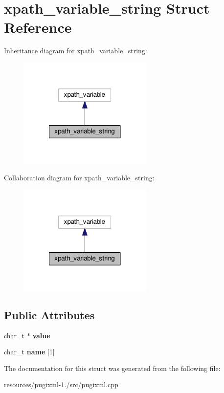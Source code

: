 \hypertarget{structxpath__variable__string}{\section{xpath\+\_\+variable\+\_\+string Struct Reference}
\label{structxpath__variable__string}
}


Inheritance diagram for xpath\+\_\+variable\+\_\+string\+:
\nopagebreak
\begin{figure}[H]
\begin{center}
\leavevmode
\includegraphics[width=188pt]{structxpath__variable__string__inherit__graph}
\end{center}
\end{figure}


Collaboration diagram for xpath\+\_\+variable\+\_\+string\+:
\nopagebreak
\begin{figure}[H]
\begin{center}
\leavevmode
\includegraphics[width=188pt]{structxpath__variable__string__coll__graph}
\end{center}
\end{figure}
\subsection*{Public Attributes}
\begin{DoxyCompactItemize}
\item 
\hypertarget{structxpath__variable__string_aeb8a87a8457d2615cd7b766fd3f30559}{char\+\_\+t $\ast$ {\bfseries value}}\label{structxpath__variable__string_aeb8a87a8457d2615cd7b766fd3f30559}

\item 
\hypertarget{structxpath__variable__string_a5c43cdcc55a620db0e7bdd29b4d56e89}{char\+\_\+t {\bfseries name} \mbox{[}1\mbox{]}}\label{structxpath__variable__string_a5c43cdcc55a620db0e7bdd29b4d56e89}

\end{DoxyCompactItemize}


The documentation for this struct was generated from the following file\+:\begin{DoxyCompactItemize}
\item 
resources/pugixml-\/1./src/pugixml.\+cpp\end{DoxyCompactItemize}
